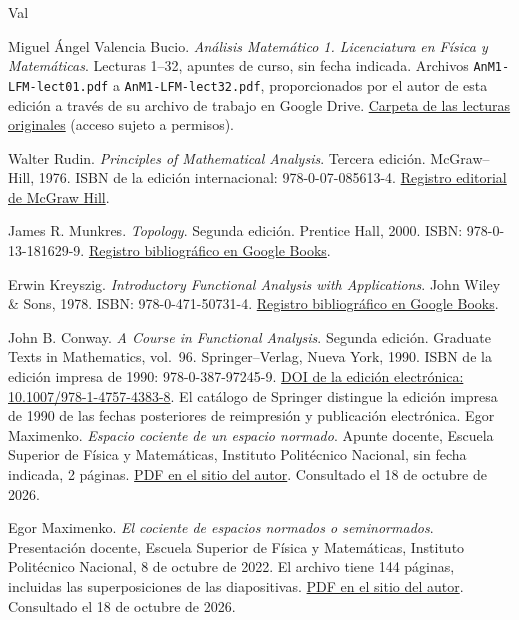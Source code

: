 \begin{thebibliography}{Val}
Miguel Ángel Valencia Bucio.
\emph{Análisis Matemático 1. Licenciatura en Física y Matemáticas}.
Lecturas 1--32, apuntes de curso, sin fecha indicada.
Archivos \texttt{AnM1-LFM-lect01.pdf} a \texttt{AnM1-LFM-lect32.pdf}, proporcionados por el autor de esta edición a través de su archivo de trabajo en Google Drive.
\href{https://drive.google.com/drive/folders/12qZh4h3wXB83V2dzuUmPrT-tFyURtZQJ}{Carpeta de las lecturas originales} (acceso sujeto a permisos).

Walter Rudin. \emph{Principles of Mathematical Analysis}.
Tercera edición. McGraw--Hill, 1976.
ISBN de la edición internacional: 978-0-07-085613-4.
\href{https://www.mheducation.co.uk/principles-of-mathematical-analysis-int-l-ed-9780070856134-emea}{Registro editorial de McGraw Hill}.

James R. Munkres. \emph{Topology}.
Segunda edición. Prentice Hall, 2000.
ISBN: 978-0-13-181629-9.
\href{https://books.google.com/books/about/Topology.html?id=XjoZAQAAIAAJ}{Registro bibliográfico en Google Books}.

Erwin Kreyszig. \emph{Introductory Functional Analysis with Applications}.
John Wiley \& Sons, 1978.
ISBN: 978-0-471-50731-4.
\href{https://books.google.com/books/about/Introductory_Functional_Analysis_with_Ap.html?id=Va8rAAAAYAAJ}{Registro bibliográfico en Google Books}.

John B. Conway. \emph{A Course in Functional Analysis}.
Segunda edición. Graduate Texts in Mathematics, vol.~96.
Springer--Verlag, Nueva York, 1990.
ISBN de la edición impresa de 1990: 978-0-387-97245-9.
\href{https://doi.org/10.1007/978-1-4757-4383-8}{DOI de la edición electrónica: 10.1007/978-1-4757-4383-8}.
El catálogo de Springer distingue la edición impresa de 1990 de las fechas posteriores de reimpresión y publicación electrónica.
Egor Maximenko. \emph{Espacio cociente de un espacio normado}.
Apunte docente, Escuela Superior de Física y Matemáticas, Instituto Politécnico Nacional, sin fecha indicada, 2 páginas.
\href{https://esfm.egormaximenko.com/analysis/quotient_space_of_normed_space_es.pdf}{PDF en el sitio del autor}.
Consultado el 18 de octubre de 2026.

Egor Maximenko. \emph{El cociente de espacios normados o seminormados}.
Presentación docente, Escuela Superior de Física y Matemáticas, Instituto Politécnico Nacional, 8 de octubre de 2022.
El archivo tiene 144 páginas, incluidas las superposiciones de las diapositivas.
\href{https://esfm.egormaximenko.com/analysis/normed_spaces_quotient_presentation_es.pdf}{PDF en el sitio del autor}.
Consultado el 18 de octubre de 2026.


\end{thebibliography}
